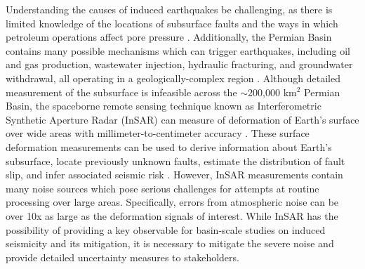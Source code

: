 Understanding the causes of induced earthquakes be challenging, as there is limited knowledge of the locations of subsurface faults and the ways in which petroleum operations affect pore pressure \citep{Hennings2021StabilityFaultSystems}. Additionally, the Permian Basin contains many possible mechanisms which can trigger earthquakes, including oil and gas production, wastewater injection, hydraulic fracturing, and groundwater withdrawal, all operating in a geologically-complex region \citep{Smye2021VariationsVerticalStress}.
Although detailed measurement of the subsurface is infeasible across the $\sim$200,000 km$^2$ Permian Basin, the spaceborne remote sensing technique known as Interferometric Synthetic Aperture Radar (InSAR) can measure of deformation of Earth's surface over wide areas with millimeter-to-centimeter accuracy \citep{Massonnet1993DisplacementFieldLanders, Buergmann2000SyntheticApertureRadar}. These surface deformation measurements can be used to derive information about Earth's subsurface, locate previously unknown faults, estimate the distribution of fault slip, and infer associated seismic risk \citep{Segall2010EarthquakeVolcanoDeformation, Elliott2016RoleSpaceBased, Huang2017FaultGeometryInversion}.
However, InSAR measurements contain many noise sources which pose serious challenges for attempts at routine processing over large areas. Specifically, errors from atmospheric noise can be over 10x as large as the deformation signals of interest.
While InSAR has the possibility of providing a key observable for basin-scale studies on induced seismicity and its mitigation, it is necessary to mitigate the severe noise and provide detailed uncertainty measures to stakeholders.





